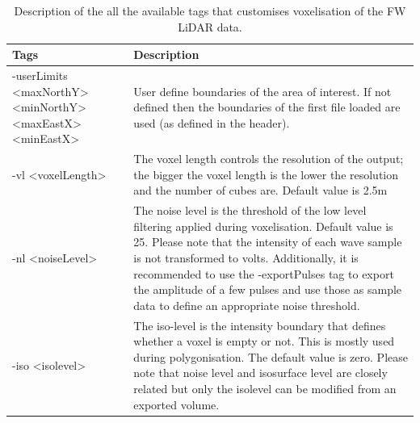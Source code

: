 \documentclass{article}
\begin{document}
			
			\begin{table}[!htbp]
			\centering
				\begin{tabular}{|p{2.8cm}|p{11.3cm}|}
					\toprule
					\textbf{Tags}  & \textbf{Description}  \\
					\midrule
					-userLimits \newline<maxNorthY> \newline<minNorthY> \newline<maxEastX>\newline <minEastX> & User define boundaries of the area of interest. If not defined then the boundaries of the first file loaded are used (as defined in the header).\\
					\cmidrule(r){1-1}\cmidrule(l){2-2}
					-vl <voxelLength>   & The voxel length controls the resolution of the output; the bigger the voxel length is the lower the resolution and the number of cubes are. Default value is 2.5m\\
					\midrule
					-nl <noiseLevel>  &  The noise level is the threshold of the low level filtering applied during voxelisation. Default value is 25. Please note that the intensity of each wave sample is not transformed to volts. 
					Additionally, it is recommended to use the -exportPulses tag to export the amplitude of a few pulses and use those as sample data to define an appropriate noise threshold. \\
					\cmidrule(r){1-1}\cmidrule(l){2-2}
					-iso <isolevel>    & The iso-level is the intensity boundary that defines whether a voxel is empty or not. This is mostly used during polygonisation. The default value is zero. Please note that noise level and isosurface level are closely related but only the isolevel can be modified from an exported volume.\\			
					
					\bottomrule
				\end{tabular}
				\caption{Description of the all the available tags that customises voxelisation of the FW LiDAR data.}
				\label{table:parameters}
			\end{table}
			
\end{document}
